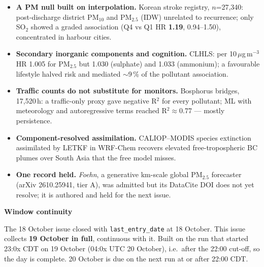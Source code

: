 \documentclass[10pt]{article}
\begin{document}
\footnotesize
\begin{itemize}

\item \textbf{A PM null built on interpolation.} Korean stroke registry, $n$=27,340: post-discharge district PM$_{10}$
and PM$_{2.5}$ (IDW) unrelated to recurrence; only SO$_2$ showed a graded association (Q4 vs Q1 HR \textbf{1.19},
0.94--1.50), concentrated in harbour cities.

\item \textbf{Secondary inorganic components and cognition.} CLHLS: per 10\,$\mu$g\,m$^{-3}$ HR 1.005 for PM$_{2.5}$
but 1.030 (sulphate) and 1.033 (ammonium); a favourable lifestyle halved risk and mediated $\sim$9\,\% of the
pollutant association.

\item \textbf{Traffic counts do not substitute for monitors.} Bosphorus bridges, 17,520\,h: a traffic-only proxy gave
negative R$^2$ for every pollutant; ML with meteorology and autoregressive terms reached R$^2\approx$0.77 ---
mostly persistence.

\item \textbf{Component-resolved assimilation.} CALIOP--MODIS species extinction assimilated by LETKF in WRF-Chem
recovers elevated free-tropospheric BC plumes over South Asia that the free model misses.

\item \textbf{One record held.} \emph{Foehn}, a generative km-scale global PM$_{2.5}$ forecaster (arXiv 2610.25941,
tier A), was admitted but its DataCite DOI does not yet resolve; it is authored and held for the next issue.

\end{itemize}

\vspace{2mm}

\begin{keybox}
{\sffamily\bfseries\footnotesize\color{Deep}Window continuity}\\[1.2mm]
{\fontsize{7.2}{8.8}\selectfont
The 18 October issue closed with \texttt{last\_entry\_date} at 18 October. This issue collects
\textbf{19 October in full}, continuous with it. Built on the run that started 23:0x CDT on 19 October (04:0x UTC
20 October), i.e.\ after the 22:00 cut-off, so the day is complete. 20 October is due on the next run at or after
22:00 CDT.\par}
\end{keybox}

\vspace{3mm}
\par{}\baselineskip{}\baselineskip
\end{document}
